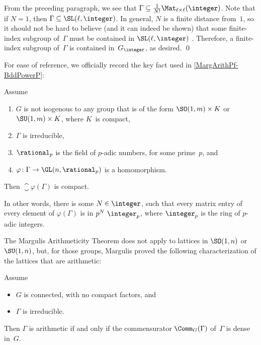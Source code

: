  From the preceding paragraph, we see that 
 $\Gamma \subseteq \frac{1}{N!} \Mat_{\ell
\times \ell}(\integer)$. Note that if $N = 1$, then $\Gamma
\subseteq \SL(\ell,\integer)$. In general, $N$ is a finite 
distance from~$1$, so it should not be hard to believe
(and it can indeed be shown) that some 
finite-index subgroup of~$\Gamma$ must be contained
in $\SL(\ell,\integer)$ . Therefore, a finite-index subgroup
of~$\Gamma$ is contained in~$G_{\integer}$, as desired.
\qed

\medbreak

For ease of reference, we officially record the key fact used in \cref{MargArithPf-BddPowerP}:

\begin{thm} \label{padicSuper}
Assume
\noprelistbreak
	\begin{enumerate} \renewcommand{\theenumi}{\roman{enumi}}
	\item $G$ is not isogenous to any group that is of the form\/ $\SO(1,m) \times K$ or\/ $\SU(1,m) \times K$, where $K$~is compact,
	\item $\Gamma$ is irreducible,
	\item $\rational_p$ is the field of $p$-adic numbers, for some prime~$p$,
	and
	\item $\varphi \colon \Gamma \to \GL(n,\rational_p)$ is a homomorphism.
	\end{enumerate}
Then $\closure{\varphi(\Gamma)}$ is compact.

In other words, there is some $N \in \integer$, such that every matrix entry of every element of $\varphi(\Gamma)$ is in $p^N \ \integer_p$, where $\integer_p$ is the ring of $p$-adic integers.
\end{thm}

The Margulis Arithmeticity Theorem  does not apply to lattices in $\SO(1,n)$ or $\SU(1,n)$, but, for those groups, Margulis proved the following characterization of the lattices that are arithmetic:

\begin{namedthm} \label{CommCriterion}
Assume
	\begin{itemize}
	\item $G$ is connected, with no compact factors,
	and
	\item $\Gamma$ is irreducible.
	\end{itemize}
Then\/ $\Gamma$ is arithmetic if and only if the commensurator\/ $\Comm_G(\Gamma)$ of\/~$\Gamma$ is dense in~$G$.
\end{namedthm}

